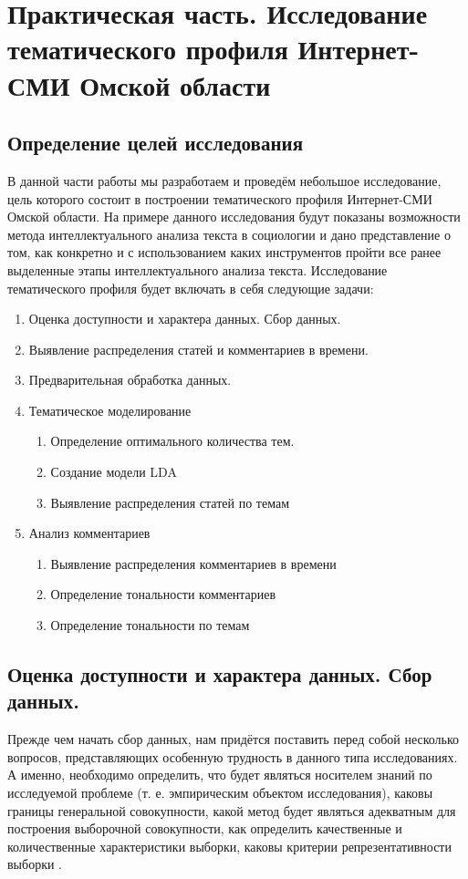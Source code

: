 \chapter{Практическая часть. Исследование тематического профиля Интернет-СМИ Омской области} \label{chapt2}
\section{Определение целей исследования} \label{sect2_1}
В данной части работы мы разработаем и проведём небольшое исследование, цель которого состоит в построении тематического профиля Интернет-СМИ Омской области. На примере данного исследования будут показаны возможности метода интеллектуального анализа текста в социологии и дано представление о том, как конкретно и с использованием каких инструментов пройти все ранее выделенные этапы интеллектуального анализа текста. Исследование тематического профиля будет включать в себя следующие задачи:

\begin{enumerate}
\item Оценка доступности и характера данных. Сбор данных.
\item Выявление распределения статей и комментариев в времени.
\item Предварительная обработка данных.
\item Тематическое моделирование
	\begin{enumerate}
	\item Определение оптимального количества тем.
	\item Создание модели LDA
	\item Выявление распределения статей по темам
	\end{enumerate}
\item Анализ комментариев
	\begin{enumerate}
	\item Выявление распределения комментариев в времени
	\item Определение тональности комментариев
	\item Определение тональности по темам
	\end{enumerate}

\end{enumerate}

\section{Оценка доступности и характера данных. Сбор данных.} \label{sect2_2}
Прежде чем начать сбор данных, нам придётся поставить перед собой несколько вопросов, представляющих особенную трудность в данного типа исследованиях. А именно, необходимо определить, что будет являться носителем знаний по исследуемой проблеме (т. е. эмпирическим объектом исследования), каковы границы генеральной совокупности, какой метод будет являться адекватным для построения выборочной совокупности, как определить качественные и количественные характеристики выборки, каковы критерии репрезентативности выборки \cite{methodlogy_internet}.

